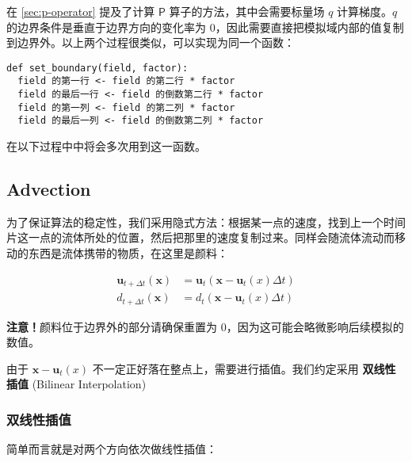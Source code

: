 \documentclass{ctexart}
\begin{document}
在 \ref{sec:p-operator} 提及了计算 $\mathsf{P}$ 算子的方法，其中会需要标量场 $q$ 计算梯度。$q$ 的边界条件是垂直于边界方向的变化率为 0，因此需要直接把模拟域内部的值复制到边界外。以上两个过程很类似，可以实现为同一个函数：

\begin{verbatim}
def set_boundary(field, factor):
  field 的第一行 <- field 的第二行 * factor
  field 的最后一行 <- field 的倒数第二行 * factor
  field 的第一列 <- field 的第二列 * factor
  field 的最后一列 <- field 的倒数第二列 * factor
\end{verbatim}

在以下过程中中将会多次用到这一函数。

\subsection{Advection}

为了保证算法的稳定性，我们采用隐式方法：根据某一点的速度，找到上一个时间片这一点的流体所处的位置，然后把那里的速度复制过来。同样会随流体流动而移动的东西是流体携带的物质，在这里是颜料：

\begin{equation}
\begin{split}
  \mathbf{u}_{t + \Delta t}(\mathbf{x}) &= \mathbf{u}_t(\mathbf{x} - \mathbf{u}_t(x) \Delta t) \\
  d_{t + \Delta t}(\mathbf{x}) &= d_t(\mathbf{x} - \mathbf{u}_t(x) \Delta t)
\end{split}
\end{equation}

\textbf{注意！}颜料位于边界外的部分请确保重置为 0，因为这可能会略微影响后续模拟的数值。

由于 $\mathbf{x} - \mathbf{u}_t(x)$ 不一定正好落在整点上，需要进行插值。我们约定采用 \textbf{双线性插值} (Bilinear Interpolation)

\subsubsection{双线性插值}

简单而言就是对两个方向依次做线性插值：

\begin{figure}[!h]
  \centering

\end{figure}
\end{document}
